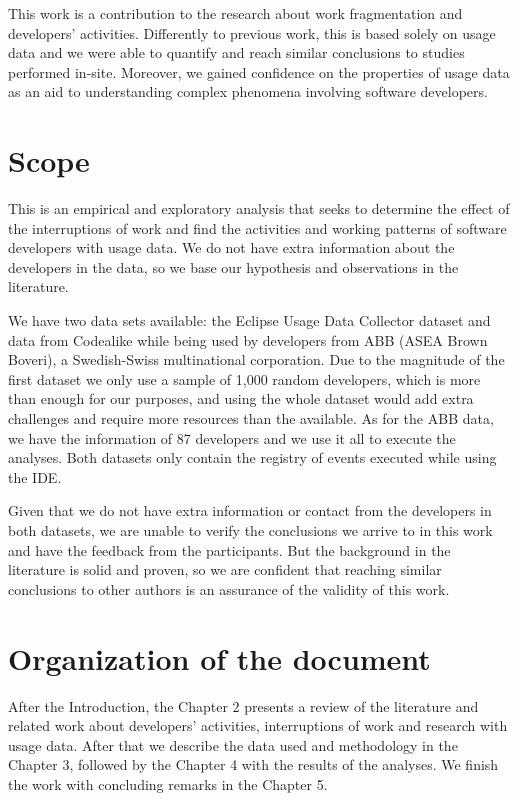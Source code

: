 \begin{changedforreviewerlong}
This work is a contribution to the research about work fragmentation and developers' activities. Differently to previous work, this is based solely on usage data and we were able to quantify and reach similar conclusions to studies performed in-site. Moreover, we gained confidence on the properties of usage data as an aid to understanding complex phenomena involving software developers.
\end{changedforreviewerlong}

\section{Scope}
This is an empirical and exploratory analysis that seeks to determine the effect of the interruptions of work and find the activities and working patterns of software developers with usage data. We do not have extra information about the developers in the data, so we base our hypothesis and observations in the literature. 

We have two data sets available: the Eclipse Usage Data Collector dataset and data from Codealike while being used by developers from ABB (ASEA Brown Boveri), a Swedish-Swiss multinational corporation. Due to the magnitude of the first dataset we only use a sample of 1,000 random developers, which is more than enough for our purposes, and using the whole dataset would add extra challenges and require more resources than the available. As for the ABB data, we have the information of 87 developers and we use it all to execute the analyses. Both datasets only contain the registry of events executed while using the IDE.

Given that we do not have extra information or contact from the developers in both datasets, we are unable to verify the conclusions we arrive to in this work and have the feedback from the participants. But the background in the literature is solid and proven, so we are confident that reaching similar conclusions to other authors is an assurance of the validity of this work.

\section{Organization of the document}

After the Introduction, the Chapter 2 presents a review of the literature and related work about developers' activities, interruptions of work and research with usage data. After that we describe the data used and methodology in the Chapter 3, followed by the Chapter 4 with the results of the analyses. We finish the work with concluding remarks in the Chapter 5.

